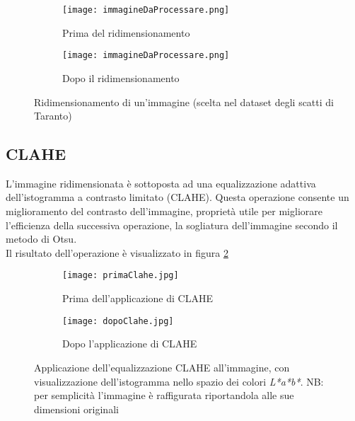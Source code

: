 \begin{figure}[h]

  \centering
  
  \begin{subfigure}[b]{0.475\textwidth}
    \texttt{[image: immagineDaProcessare.png]}
    \caption{Prima del ridimensionamento}
  \end{subfigure}
  \begin{subfigure}[b]{0.475\textwidth}
  \centering
    \texttt{[image: immagineDaProcessare.png]}
    \caption{Dopo il ridimensionamento}
  \end{subfigure}
  
  \caption{Ridimensionamento di un'immagine (scelta nel dataset degli scatti di Taranto)}
  \label{fig:ridimensionamento}
\end{figure}


\subsection*{CLAHE}
L'immagine ridimensionata è sottoposta ad una equalizzazione adattiva dell’istogramma a contrasto limitato (CLAHE). Questa operazione consente un miglioramento del contrasto dell'immagine, proprietà utile per migliorare l'efficienza della successiva operazione, la sogliatura dell'immagine secondo il metodo di Otsu.\\

\noindent Il risultato dell'operazione è visualizzato in figura \ref{fig:clahe}

\begin{figure}[h]

  \centering
  
  \begin{subfigure}[b]{0.42\textwidth}
    \texttt{[image: primaClahe.jpg]}
    \caption{Prima dell'applicazione di CLAHE}
  \end{subfigure}
  \begin{subfigure}[b]{0.42\textwidth}
  \centering
    \texttt{[image: dopoClahe.jpg]}
    \caption{Dopo l'applicazione di CLAHE}
  \end{subfigure}
  
  \caption{Applicazione dell'equalizzazione CLAHE all'immagine, con visualizzazione dell'istogramma nello spazio dei colori \textit{L*a*b*}. NB: per semplicità l'immagine è raffigurata riportandola alle sue dimensioni originali}
  \label{fig:clahe}
\end{figure}


